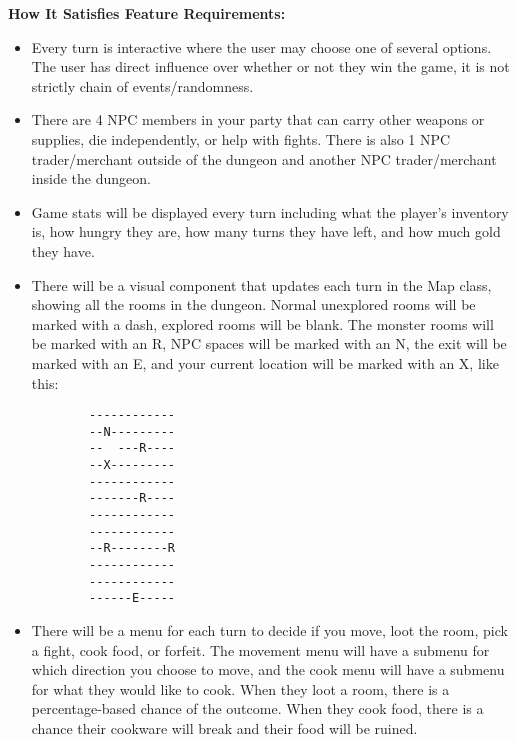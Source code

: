 \textbf{How It Satisfies Feature Requirements:} 
\begin{itemize}
    \item Every turn is interactive where the user may choose one of several options. The user has direct influence over whether or not they win the game, it is not strictly chain of events/randomness. 
    \item There are 4 NPC members in your party that can carry other weapons or supplies, die independently, or help with fights. There is also 1 NPC trader/merchant outside of the dungeon and another NPC trader/merchant inside the dungeon.
    \item Game stats will be displayed every turn including what the player's inventory is, how hungry they are, how many turns they have left, and how much gold they have.
    \item There will be a visual component that updates each turn in the Map class, showing all the rooms in the dungeon. Normal unexplored rooms will be marked with a dash, explored rooms will be blank. The monster rooms will be marked with an R, NPC spaces will be marked with an N, the exit will be marked with an E, and your current location will be marked with an X, like this:
    \begin{verbatim}
        ------------
        --N---------
        --  ---R----
        --X---------
        ------------
        -------R----
        ------------
        ------------
        --R--------R
        ------------
        ------------
        ------E-----
    \end{verbatim}
    \item There will be a menu for each turn to decide if you move, loot the room, pick a fight, cook food, or forfeit. The movement menu will have a submenu for which direction you choose to move, and the cook menu will have a submenu for what they would like to cook. When they loot a room, there is a percentage-based chance of the outcome. When they cook food, there is a chance their cookware will break and their food will be ruined.
\end{itemize}

